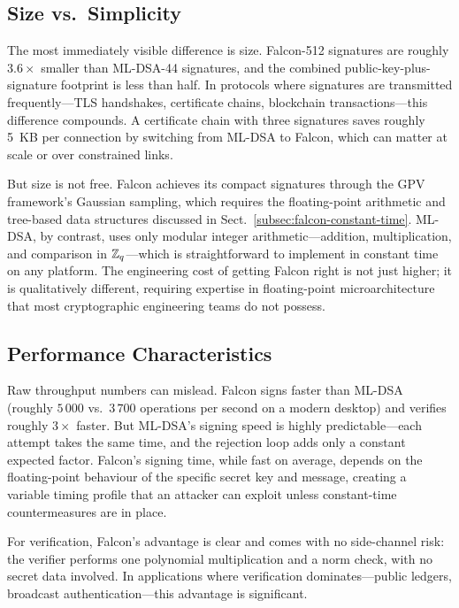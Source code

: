 \subsection{Size vs.\ Simplicity}
\label{subsec:size-vs-simplicity}

The most immediately visible difference is size.  Falcon-512 signatures are roughly $3.6\times$ smaller than ML-DSA-44 signatures, and the combined public-key-plus-signature footprint is less than half.  In protocols where signatures are transmitted frequently---TLS handshakes, certificate chains, blockchain transactions---this difference compounds.  A certificate chain with three signatures saves roughly 5~KB per connection by switching from ML-DSA to Falcon, which can matter at scale or over constrained links.

But size is not free.  Falcon achieves its compact signatures through the GPV framework's Gaussian sampling, which requires the floating-point arithmetic and tree-based data structures discussed in Sect.~\ref{subsec:falcon-constant-time}.  ML-DSA, by contrast, uses only modular integer arithmetic---addition, multiplication, and comparison in $\mathbb{Z}_q$---which is straightforward to implement in constant time on any platform.  The engineering cost of getting Falcon right is not just higher; it is qualitatively different, requiring expertise in floating-point microarchitecture that most cryptographic engineering teams do not possess.

\subsection{Performance Characteristics}
\label{subsec:perf-characteristics}

Raw throughput numbers can mislead.  Falcon signs faster than ML-DSA (roughly $5\,000$ vs.\ $3\,700$ operations per second on a modern desktop) and verifies roughly $3\times$ faster.  But ML-DSA's signing speed is highly predictable---each attempt takes the same time, and the rejection loop adds only a constant expected factor.  Falcon's signing time, while fast on average, depends on the floating-point behaviour of the specific secret key and message, creating a variable timing profile that an attacker can exploit unless constant-time countermeasures are in place.

For verification, Falcon's advantage is clear and comes with no side-channel risk: the verifier performs one polynomial multiplication and a norm check, with no secret data involved.  In applications where verification dominates---public ledgers, broadcast authentication---this advantage is significant.

